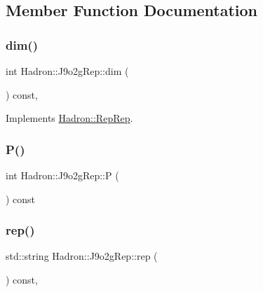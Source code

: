 \subsection{Member Function Documentation}
\mbox{\label{structHadron_1_1J9o2gRep_a82b4805525de58991ef3a0f533d3586e}} 
\subsubsection{\texorpdfstring{dim()}{dim()}}
{\footnotesize\ttfamily int Hadron\+::\+J9o2g\+Rep\+::dim (\begin{DoxyParamCaption}{ }\end{DoxyParamCaption}) const\hspace{0.3cm}{\ttfamily [inline]}, {\ttfamily [virtual]}}



Implements \mbox{\hyperlink{structHadron_1_1RepRep_a92c8802e5ed7afd7da43ccfd5b7cd92b}{Hadron\+::\+Rep\+Rep}}.

\mbox{\label{structHadron_1_1J9o2gRep_a6c3ba214106f1ad5c9e0923094b620f1}} 
\subsubsection{\texorpdfstring{P()}{P()}}
{\footnotesize\ttfamily int Hadron\+::\+J9o2g\+Rep\+::P (\begin{DoxyParamCaption}{ }\end{DoxyParamCaption}) const\hspace{0.3cm}{\ttfamily [inline]}}

\mbox{\label{structHadron_1_1J9o2gRep_aa491d694a97b89b0ebf62632fb8b4f8b}} 
\subsubsection{\texorpdfstring{rep()}{rep()}}
{\footnotesize\ttfamily std\+::string Hadron\+::\+J9o2g\+Rep\+::rep (\begin{DoxyParamCaption}{ }\end{DoxyParamCaption}) const\hspace{0.3cm}{\ttfamily [inline]}, {\ttfamily [virtual]}}



